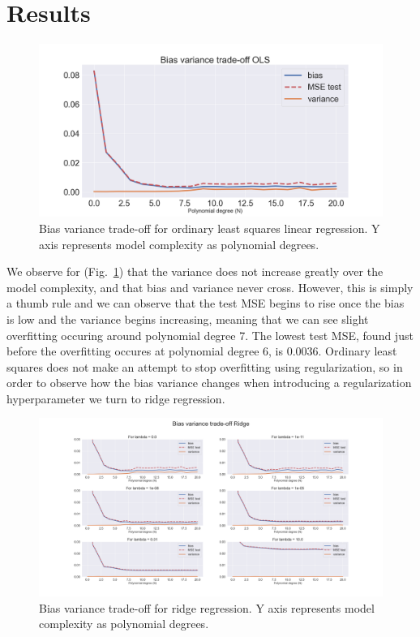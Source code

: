 \documentclass[onecolumn,10pt,cleanfoot]{asme2ej}
\begin{document}
\section{Results}

\begin{figure}[h]
\centerline{\includegraphics[width=5in]{figs/BV_OLS.png}}
\caption{Bias variance trade-off for ordinary least squares linear regression. Y axis represents model complexity as polynomial degrees.}
\label{OLS}
\end{figure}

We observe for (Fig.~\ref{OLS}) that the variance does not increase greatly over the model complexity, and that bias and variance never cross. However, this is simply a thumb rule and we can observe that the test MSE begins to rise once the bias is low and the variance begins increasing, meaning that we can see slight overfitting occuring around polynomial degree 7. The lowest test MSE, found just before the overfitting occures at polynomial degree 6, is 0.0036. Ordinary least squares does not make an attempt to stop overfitting using regularization, so in order to observe how the bias variance changes when introducing a regularization hyperparameter we turn to ridge regression.

\begin{figure}[H]
\centerline{\includegraphics[width=9in]{figs/BV_Ridge.png}}
\caption{Bias variance trade-off for ridge regression. Y axis represents model complexity as polynomial degrees.}
\label{Ridge}
\end{figure}
\end{document}
